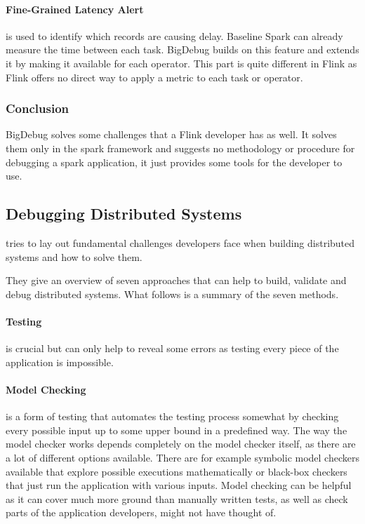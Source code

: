 \paragraph{Fine-Grained Latency Alert} is used to identify which records are causing delay. Baseline Spark can already measure the time between each task. BigDebug builds on this feature and extends it by making it available for each operator. This part is quite different in Flink as Flink offers no direct way to apply a metric to each task or operator.

\subsubsection{Conclusion}
BigDebug solves some challenges that a Flink developer has as well. It solves them only in the spark framework and suggests no methodology or procedure for debugging a spark application, it just provides some tools for the developer to use.

\subsection{Debugging Distributed Systems}
\label{debuggingDistributedSystems}

\cite{Beschastnikh:2016:DDS:2927299.2940294} tries to lay out fundamental challenges developers face when building distributed systems and how to solve them.

They give an overview of seven approaches that can help to build, validate and debug distributed systems. What follows is a summary of the seven methods.

\paragraph{Testing} is crucial but can only help to reveal some errors as testing every piece of the application is impossible.

\paragraph{Model Checking} is a form of testing that automates the testing process somewhat by checking every possible input up to some upper bound in a predefined way. The way the model checker works depends completely on the model checker itself, as there are a lot of different options available. There are for example symbolic model checkers available that explore possible executions mathematically or black-box checkers that just run the application with various inputs. Model checking can be helpful as it can cover much more ground than manually written tests, as well as check parts of the application developers, might not have thought of.


